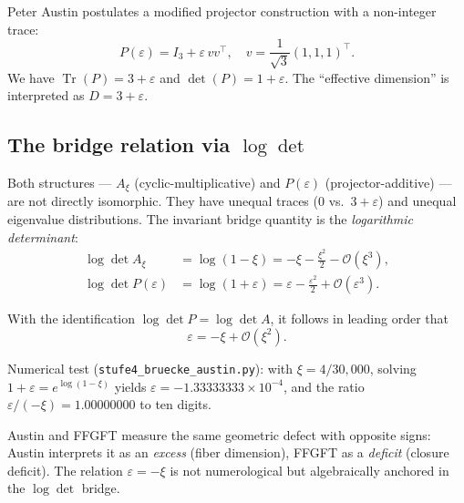 Peter Austin postulates a modified projector construction with a non-integer trace:
\begin{equation}
P(\varepsilon) = I_3 + \varepsilon\, vv^\top, \quad v = \frac{1}{\sqrt{3}}(1, 1, 1)^\top.
\label{eq:Paustin}
\end{equation}
We have \(\operatorname{Tr}(P) = 3 + \varepsilon\) and \(\det(P) = 1 + \varepsilon\). The ``effective dimension'' is interpreted as \(D = 3 + \varepsilon\).

\subsection[The bridge relation via log det]{The bridge relation via \texorpdfstring{\(\log \det\)}{log det}}

Both structures --- \(A_\xi\) (cyclic-multiplicative) and \(P(\varepsilon)\) (projector-additive) --- are not directly isomorphic. They have unequal traces (\(0\) vs.~\(3+\varepsilon\)) and unequal eigenvalue distributions. The invariant bridge quantity is the \emph{logarithmic determinant}:
\begin{align}
\log \det A_\xi &= \log(1 - \xi) = -\xi - \frac{\xi^2}{2} - \mathcal{O}(\xi^3),\\
\log \det P(\varepsilon) &= \log(1 + \varepsilon) = \varepsilon - \frac{\varepsilon^2}{2} + \mathcal{O}(\varepsilon^3).
\end{align}

\begin{keyresult}
With the identification \(\log \det P = \log \det A\), it follows in leading order that
\begin{equation}
\boxed{\varepsilon = -\xi + \mathcal{O}(\xi^2).}
\label{eq:eps_xi}
\end{equation}
\end{keyresult}

Numerical test (\texttt{stufe4\_bruecke\_austin.py}): with \(\xi = 4/30{,}000\), solving \(1 + \varepsilon = e^{\log(1-\xi)}\) yields \(\varepsilon = -1.33333333 \times 10^{-4}\), and the ratio \(\varepsilon / (-\xi) = 1.00000000\) to ten digits.

\begin{interpretation}
Austin and FFGFT measure the same geometric defect with opposite signs: Austin interprets it as an \emph{excess} (fiber dimension), FFGFT as a \emph{deficit} (closure deficit). The relation \(\varepsilon = -\xi\) is not numerological but algebraically anchored in the \(\log\det\) bridge.
\end{interpretation}

